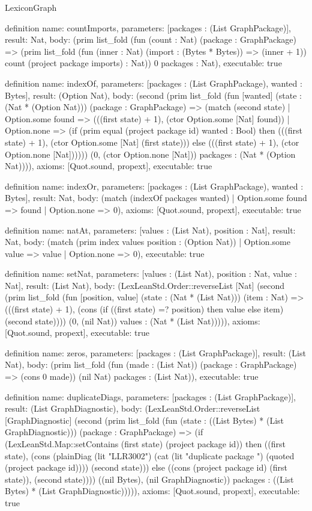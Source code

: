 \begin{lexlean}{LexiconGraph}
\begin{semanticmodule}
definition{
  name: countImports,
  parameters: [packages : (List GraphPackage)],
  result: Nat,
  body: (prim list_fold (fun (count : Nat) (package : GraphPackage) => (prim list_fold (fun (inner : Nat) (import : (Bytes * Bytes)) => (inner + 1)) count (project package imports) : Nat)) 0 packages : Nat),
  executable: true
}

definition{
  name: indexOf,
  parameters: [packages : (List GraphPackage), wanted : Bytes],
  result: (Option Nat),
  body: (second (prim list_fold (fun [wanted] (state : (Nat * (Option Nat))) (package : GraphPackage) => (match (second state)
    | Option.some found => (((first state) + 1), (ctor Option.some [Nat] found))
    | Option.none => (if (prim equal (project package id) wanted : Bool) then (((first state) + 1), (ctor Option.some [Nat] (first state))) else (((first state) + 1), (ctor Option.none [Nat]))))) (0, (ctor Option.none [Nat])) packages : (Nat * (Option Nat)))),
  axioms: [Quot.sound, propext],
  executable: true
}

definition{
  name: indexOr,
  parameters: [packages : (List GraphPackage), wanted : Bytes],
  result: Nat,
  body: (match (indexOf packages wanted)
    | Option.some found => found
    | Option.none => 0),
  axioms: [Quot.sound, propext],
  executable: true
}

definition{
  name: natAt,
  parameters: [values : (List Nat), position : Nat],
  result: Nat,
  body: (match (prim index values position : (Option Nat))
    | Option.some value => value
    | Option.none => 0),
  executable: true
}

definition{
  name: setNat,
  parameters: [values : (List Nat), position : Nat, value : Nat],
  result: (List Nat),
  body: (LexLeanStd.Order::reverseList [Nat] (second (prim list_fold (fun [position, value] (state : (Nat * (List Nat))) (item : Nat) => (((first state) + 1), (cons (if ((first state) =? position) then value else item) (second state)))) (0, (nil Nat)) values : (Nat * (List Nat))))),
  axioms: [Quot.sound, propext],
  executable: true
}

definition{
  name: zeros,
  parameters: [packages : (List GraphPackage)],
  result: (List Nat),
  body: (prim list_fold (fun (made : (List Nat)) (package : GraphPackage) => (cons 0 made)) (nil Nat) packages : (List Nat)),
  executable: true
}

definition{
  name: duplicateDiags,
  parameters: [packages : (List GraphPackage)],
  result: (List GraphDiagnostic),
  body: (LexLeanStd.Order::reverseList [GraphDiagnostic] (second (prim list_fold (fun (state : ((List Bytes) * (List GraphDiagnostic))) (package : GraphPackage) => (if (LexLeanStd.Map::setContains (first state) (project package id)) then ((first state), (cons (plainDiag (lit "LLR3002") (cat (lit "duplicate package ") (quoted (project package id)))) (second state))) else ((cons (project package id) (first state)), (second state)))) ((nil Bytes), (nil GraphDiagnostic)) packages : ((List Bytes) * (List GraphDiagnostic))))),
  axioms: [Quot.sound, propext],
  executable: true
}


\end{semanticmodule}
\end{lexlean}
